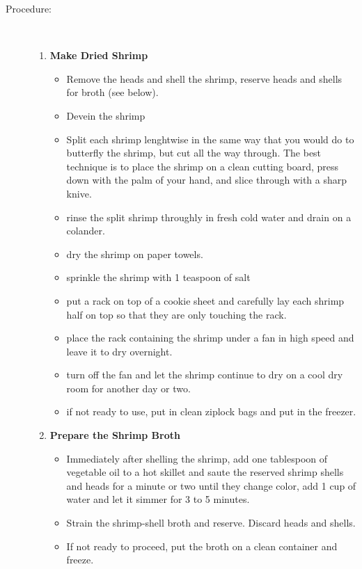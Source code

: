 \documentclass[11pt,letterpaper]{article}
\begin{document}
\begin{description}
\item[Procedure:]\ \\
	\begin{enumerate}
	\item {\bf Make Dried Shrimp}
	\begin{itemize}
	\item Remove the heads and shell the shrimp, reserve heads and shells for broth (see below).
	\item Devein the shrimp 
        \item Split each shrimp lenghtwise in the same way that you
          would do to butterfly the shrimp, but cut all the way
          through. The best technique is to place the shrimp on a
          clean cutting board, press down with the palm of your hand,
          and slice through with a sharp knive.
        \item rinse the split shrimp throughly in fresh cold water and
          drain on a colander.
        \item dry the shrimp on paper towels.
        \item sprinkle the shrimp with 1 teaspoon of salt
        \item put a rack on top of a cookie sheet and carefully lay
          each shrimp half on top so that they are only touching the
          rack.
        \item place the rack containing the shrimp under a fan in high
          speed and leave it to dry overnight.
        \item turn off the fan and let the shrimp continue to dry on a
          cool dry room for another day or two.
        \item if not ready to use, put in clean ziplock bags and put
          in the freezer.
        \end{itemize}
	\item {\bf Prepare the Shrimp Broth}
	\begin{itemize}
	\item Immediately after shelling the shrimp, add one
          tablespoon of vegetable oil to a hot skillet and saute the
          reserved shrimp shells and heads for a minute or two until
          they change color, add 1 cup of water and let it simmer for
          3 to 5 minutes.
	\item Strain the shrimp-shell broth and reserve. Discard heads
          and shells.
        \item If not ready to proceed, put the broth on a clean
          container and freeze.

\end{itemize}
\end{enumerate}
\end{description}
\end{document}
